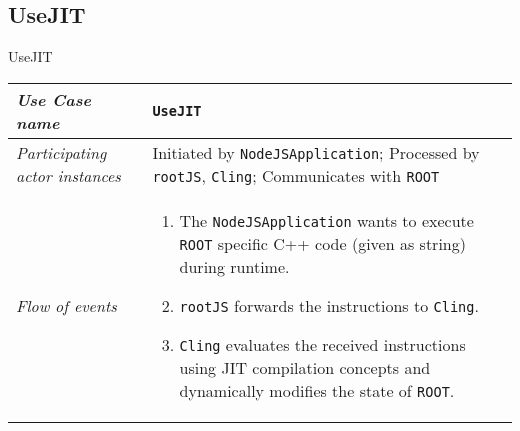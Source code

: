 \subsection{UseJIT}
\begin{frame}{UseJIT}
        \begin{longtable}{p{3cm} @{\hskip 1cm} p{7cm}}
                \hline

                \textit{Use Case name} & \texttt{UseJIT}\\
                \hline

                \textit{Participating actor instances} & Initiated by \texttt{NodeJSApplication}; Processed by \texttt{rootJS}, \texttt{Cling}; Communicates with \texttt{ROOT}\\
                \hline

                \textit{Flow of events} &
                        \begin{enumerate}
                                \pause

                                \item The \texttt{NodeJSApplication} wants to execute \texttt{ROOT} specific C++ code (given as string) during runtime.
                                \pause

                                \item \texttt{rootJS} forwards the instructions to \texttt{Cling}.
                                \pause

                                \item \texttt{Cling} evaluates the received instructions using JIT compilation concepts and dynamically modifies the state of \texttt{ROOT}.
                        \end{enumerate}
                        \\
        \end{longtable}
\end{frame}
